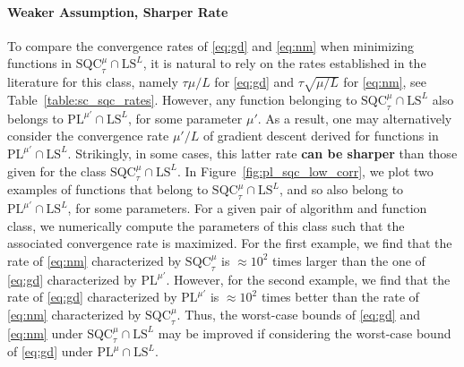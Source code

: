 \documentclass{article}
\newcommand{\jh}[1]{{\color{red} #1}}
\def\pl{{\text{PL}^\mu}}
\newcommand{\sqc}{\text{SQC}_{\tau}^{\mu}}
\newcommand{\ls}{\text{LS}^{L}}
\newcommand{\plf}[1]{\text{PL}^{#1}}
\theoremstyle{plain}
\theoremstyle{definition}
\theoremstyle{remark}
\begin{document}
\paragraph{Weaker Assumption, Sharper Rate}
To compare the convergence rates of \eqref{eq:gd} and \eqref{eq:nm} when minimizing functions in
$\sqc \cap \ls$, it is natural to rely on the rates established in the literature for this
class, namely $\tau\mu/L$ for \eqref{eq:gd} and $\tau\sqrt{\mu/L}$ for \eqref{eq:nm},
see Table~\ref{table:sc_sqc_rates}.
However, any function belonging to $\sqc \cap \ls$ also belongs to $\plf{\mu'} \cap \ls$, for some parameter $\mu'$. %
As a result, one
may alternatively consider the convergence rate $\mu'/L$ of gradient descent derived for functions in
$\plf{\mu'} \cap \ls$.
Strikingly, in some cases, this latter rate
\textbf{can be sharper} than those given for the class $\sqc \cap \ls$.
In Figure~\ref{fig:pl_sqc_low_corr}, we plot two examples of functions that belong to $\sqc \cap \ls$, and so also belong to $\plf{\mu'}  \cap \ls$, for some parameters. For a given pair of algorithm and function class, we numerically compute the parameters of this class such that the associated convergence rate is maximized. 
For the first example, we find that the rate of \eqref{eq:nm} characterized by $\sqc$ is $\approx 10^{2}$ times larger than the one of \eqref{eq:gd} characterized by $\plf{\mu'}$.
However, for the second example, we find that the rate of \eqref{eq:gd} characterized by $\plf{\mu'}$ is $\approx 10^2$ times better than the rate of \eqref{eq:nm} characterized by $\sqc$. Thus, the worst-case bounds of \eqref{eq:gd} and \eqref{eq:nm} under $\sqc \cap \ls$ may be improved if considering the worst-case bound of \eqref{eq:gd} under $\pl \cap \ls$. 
\end{document}
